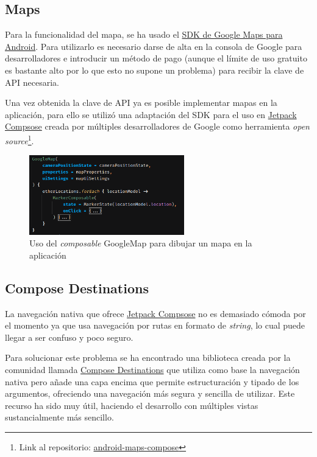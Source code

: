 \subsection{Maps}
Para la funcionalidad del mapa, se ha usado el \href{https://developers.google.com/maps/documentation/android-sdk}{SDK de Google Maps para Android}. Para utilizarlo es necesario darse de alta en la consola de Google para desarrolladores e introducir un método de pago (aunque el límite de uso gratuito es bastante alto por lo que esto no supone un problema) para recibir la clave de API necesaria.

Una vez obtenida la clave de API ya es posible implementar mapas en la aplicación, para ello se utilizó una adaptación del SDK para el uso en \hyperlink{subsec:compose}{Jetpack Compsose} creada por múltiples desarrolladores de Google como herramienta \textit{open source}\footnote{Link al repositorio: \href{https://github.com/googlemaps/android-maps-compose}{android-maps-compose}}.
\begin{figure}[h]
	\centering
	\includegraphics[width = 0.6\textwidth]{Imagenes/Fuentes/maps_compose.png}
	\caption{Uso del \textit{composable} GoogleMap para dibujar un mapa en la aplicación}
	\label{fig:maps_compose}
\end{figure}
\subsection{Compose Destinations}
La navegación nativa que ofrece \hyperlink{subsec:compose}{Jetpack Compsose} no es demasiado cómoda por el momento ya que usa navegación por rutas en formato de \textit{string}, lo cual puede llegar a ser confuso y poco seguro. 

Para solucionar este problema se ha encontrado una biblioteca creada por la comunidad llamada \href{https://github.com/raamcosta/compose-destinations}{Compose Destinations} que utiliza como base la navegación nativa pero añade una capa encima que permite estructuración y tipado de los argumentos, ofreciendo una navegación más segura y sencilla de utilizar. Este recurso ha sido muy útil, haciendo el desarrollo con múltiples vistas sustancialmente más sencillo.

